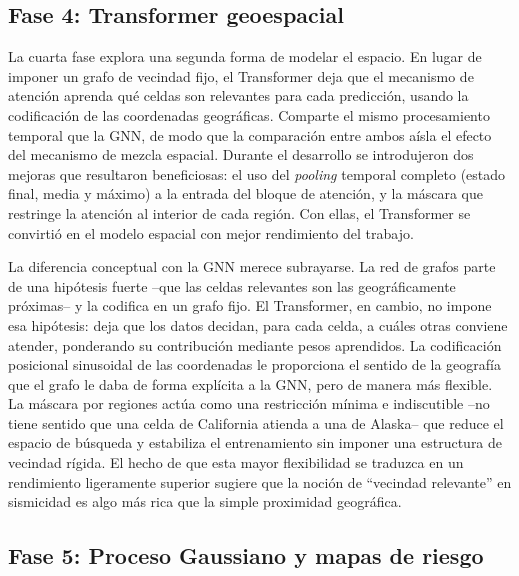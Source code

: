 \subsection{Fase 4: Transformer geoespacial}
\label{dev-transformer}

La cuarta fase explora una segunda forma de modelar el espacio. En lugar de imponer un grafo de
vecindad fijo, el Transformer deja que el mecanismo de atención aprenda qué celdas son
relevantes para cada predicción, usando la codificación de las coordenadas geográficas. Comparte
el mismo procesamiento temporal que la GNN, de modo que la comparación entre ambos aísla el
efecto del mecanismo de mezcla espacial. Durante el desarrollo se introdujeron dos mejoras que
resultaron beneficiosas: el uso del \textit{pooling} temporal completo (estado final, media y
máximo) a la entrada del bloque de atención, y la máscara que restringe la atención al interior
de cada región. Con ellas, el Transformer se convirtió en el modelo espacial con mejor
rendimiento del trabajo.

La diferencia conceptual con la GNN merece subrayarse. La red de grafos parte de una hipótesis
fuerte --que las celdas relevantes son las geográficamente próximas-- y la codifica en un grafo
fijo. El Transformer, en cambio, no impone esa hipótesis: deja que los datos decidan, para cada
celda, a cuáles otras conviene atender, ponderando su contribución mediante pesos aprendidos. La
codificación posicional sinusoidal de las coordenadas le proporciona el sentido de la geografía
que el grafo le daba de forma explícita a la GNN, pero de manera más flexible. La máscara por
regiones actúa como una restricción mínima e indiscutible --no tiene sentido que una celda de
California atienda a una de Alaska-- que reduce el espacio de búsqueda y estabiliza el
entrenamiento sin imponer una estructura de vecindad rígida. El hecho de que esta mayor
flexibilidad se traduzca en un rendimiento ligeramente superior sugiere que la noción de
``vecindad relevante'' en sismicidad es algo más rica que la simple proximidad geográfica.

\subsection{Fase 5: Proceso Gaussiano y mapas de riesgo}
\label{dev-gp}


